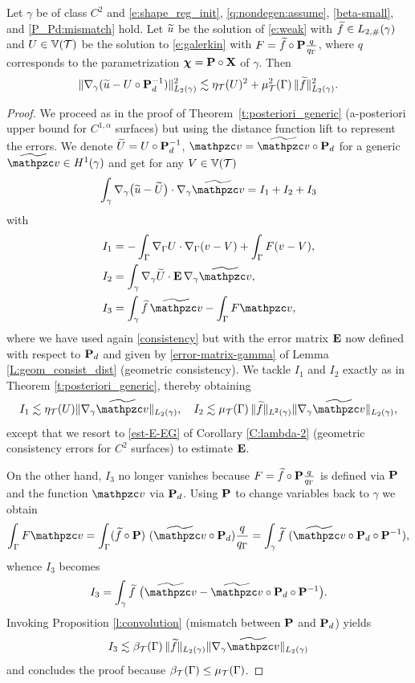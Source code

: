  
\begin{theorem}\label{T:apost-upper-dist} 
Let $\gamma$ be of class $C^2$ and \eqref{e:shape_reg_init},
\eqref{q:nondegen:assume}, \eqref{beta-small},  and \eqref{P_Pd:mismatch} hold.
Let $\widetilde{u}$ be the solution of \eqref{e:weak} with $\widetilde{f} \in L_{2,\#}(\gamma)$ and
$U \in \mathbb{V}(\mathcal{T})$ be the solution to \eqref{e:galerkin} with
$F = \widetilde{f} \circ {\bf P} \frac{q}{q_\Gamma}$, where $q$ corresponds to the parametrization ${\boldsymbol \chi} = {\bf P} \circ {\bf X}$ of $\gamma$. Then
$$
\| \nabla_\gamma (\widetilde{u} - U \circ {\bf P}_d^{-1}) \|_{L_2(\gamma)}^2 \lesssim \eta_{\mathcal{T}}(U)^2
+ \mu_{\mathcal{T}}^2(\Gamma) \, \| \widetilde{f} \|_{L_2(\gamma)}^2.
$$
\end{theorem}
%
\begin{proof}
We proceed as in the proof of Theorem~\ref{t:posteriori_generic} (a-posteriori upper
bound for $C^{1,\alpha}$ surfaces) but using the distance function lift to represent
the errors. We denote
$\widetilde{U} = U \circ {\bf P}_d^{-1}$, $\tv = \widetilde\tv \circ \bP_d$ for a generic
$\widetilde\tv\in H^1(\gamma)$ and get for any $V\in \mathbb V(\mathcal{T})$
%
\begin{equation}\label{e:error_rep_dist}
\int_\gamma \nabla_\gamma \big(\wu- \widetilde{U}\big) \cdot \nabla_\gamma \wv
= I_1+I_2+I_3
\end{equation}
%
with
\begin{align*}
I_1 & = -\int_\Gamma \nabla_\Gamma U \cdot \nabla_\Gamma (v-V) +\int_\Gamma F(v-V),
\\
I_2 & = \int_\gamma \nabla_\gamma \widetilde{U} \cdot \bE \, \nabla_\gamma \wv,
\\
I_3 & = \int_\gamma \wf \, \wv - \int_\Gamma F \tv,
\end{align*}
%
where we have used again \eqref{consistency} but with the error matrix ${\bf E}$ now defined with respect to ${\bf P}_d$ and 
given by \eqref{error-matrix-gamma} of Lemma \ref{L:geom_consist_dist}
(geometric consistency). We tackle $I_1$ and $I_2$ exactly as in
Theorem \ref{t:posteriori_generic}, thereby obtaining
%
\[
I_1 \lesssim \eta_\T(U) \| \nabla_\gamma \ttv \|_{L_2(\gamma)},
\quad
I_2 \lesssim \mu_\T(\Gamma) \, \| \wf \|_{L^2(\gamma)} \| \nabla_\gamma \widetilde \tv \|_{L_2(\gamma)},
\]
%
except that we resort to \eqref{est-E-EG} of Corollary \ref{C:lambda-2} (geometric
consistency errors for $C^2$ surfaces) to estimate ${\bf E}$.

On the other hand, $I_3$ no longer vanishes because
$F=\widetilde{f}\circ{\bf P} \frac{q}{q_\Gamma}$ is defined via ${\bf P}$
and the function $\tv$ via ${\bf P}_d$. Using ${\bf P}$ to change variables back to
$\gamma$ we obtain
%
\[
\int_\Gamma F \tv = \int_\Gamma (\wf\circ\bP) ~ (\wv\circ\bP_d) \frac{q}{q_\Gamma}
= \int_\gamma \wf ~ (\wv\circ\bP_d \circ\bP^{-1}),
\]
%
whence $I_3$ becomes
%
\begin{equation}\label{e:I3-dist}
I_3 = \int_\gamma \wf ~ \big( \wv  -  \wv \circ \bP_d \circ \bP^{-1} \big). 
\end{equation}
%
%
Invoking Proposition \ref{l:convolution} (mismatch between ${\bf P}$ and ${\bf P}_d$) yields
%
\[
I_3 \lesssim \beta_\T(\Gamma) \, \| \wf \|_{L_2(\gamma)}
\| \nabla_\gamma \wv \|_{L_2(\gamma)}
\]
%
and concludes the proof because $\beta_{\mathcal{T}}(\Gamma) \le \mu_{\mathcal{T}}(\Gamma)$.
\end{proof}

